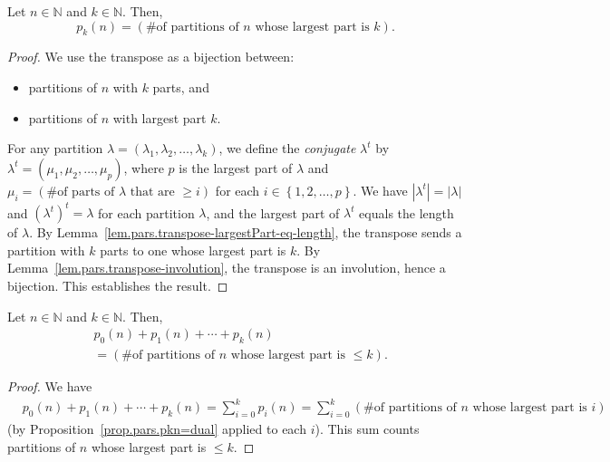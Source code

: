 \begin{proposition}
\label{prop.pars.pkn=dual}
\leantarget
\leanok
Let $n\in\mathbb{N}$ and $k\in\mathbb{N}$. Then,%
\[
p_{k}\left(  n\right)  =\left(  \text{\# of partitions of }n\text{ whose
largest part is }k\right)  .
\]
\end{proposition}

\begin{proof}
We use the transpose as a bijection between:
\begin{itemize}
\item partitions of $n$ with $k$ parts, and
\item partitions of $n$ with largest part $k$.
\end{itemize}

For any partition $\lambda=\left(
\lambda_{1},\lambda_{2},\ldots,\lambda_{k}\right)  $, we define the
\emph{conjugate} $\lambda^{t}$ by $\lambda^{t}=\left(  \mu_{1}%
,\mu_{2},\ldots,\mu_{p}\right)  $, where $p$ is the largest part of $\lambda$
and $\mu_{i}=\left(  \text{\# of parts of }\lambda\text{ that are }\geq i\right)
$ for each $i\in\left\{  1,2,\ldots,p\right\}  $.
We have $\left\vert \lambda^{t}\right\vert =\left\vert \lambda\right\vert $ and
$\left(  \lambda^{t}\right)  ^{t}=\lambda$ for each partition $\lambda$, and
the largest part of $\lambda^{t}$ equals the length of $\lambda$.
By Lemma~\ref{lem.pars.transpose-largestPart-eq-length}, the transpose sends
a partition with $k$ parts to one whose largest part is $k$.
By Lemma~\ref{lem.pars.transpose-involution}, the transpose is an involution,
hence a bijection. This establishes the result.
\end{proof}

\begin{corollary}
\label{cor.pars.p0kn=dual}
\leantarget
\leanok
Let $n\in\mathbb{N}$ and $k\in\mathbb{N}$. Then,%
\begin{align*}
&  p_{0}\left(  n\right)  +p_{1}\left(  n\right)  +\cdots+p_{k}\left(
n\right) \\
&  =\left(  \text{\# of partitions of }n\text{ whose largest part is }\leq
k\right)  .
\end{align*}
\end{corollary}

\begin{proof}
We have%
\begin{align*}
&  p_{0}\left(  n\right)  +p_{1}\left(  n\right)  +\cdots+p_{k}\left(
n\right)
=\sum_{i=0}^{k}p_{i}\left(  n\right)
=\sum_{i=0}^{k}\left(  \text{\# of partitions of }n\text{ whose largest
part is }i\right)
\end{align*}
(by Proposition~\ref{prop.pars.pkn=dual} applied to each $i$). This sum counts
partitions of $n$ whose largest part is $\leq k$.
\end{proof}

